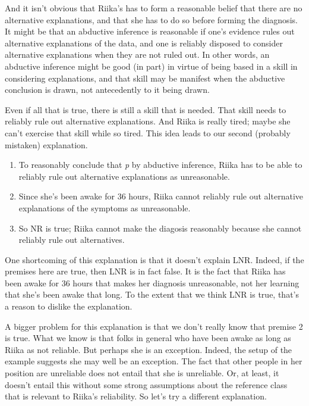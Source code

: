 And it isn't obvious that \gls{Riika}'s has to form a reasonable belief that there are no alternative explanations, and that she has to do so before forming the diagnosis. It might be that an abductive inference is reasonable if one's evidence rules out alternative explanations of the data, and one is reliably disposed to consider alternative explanations when they are not ruled out. In other words, an abductive inference might be good (in part) in virtue of being based in a skill in considering explanations, and that skill may be manifest when the abductive conclusion is drawn, not antecedently to it being drawn.

Even if all that is true, there is still a skill that is needed. That skill needs to reliably rule out alternative explanations. And \gls{Riika} is really tired; maybe she can't exercise that skill while so tired. This idea leads to our second (probably mistaken) explanation.

\begin{enumerate}
\item{} To reasonably conclude that \emph{p} by abductive inference, \gls{Riika} has to be able to reliably rule out alternative explanations as unreasonable.

\item{} Since she's been awake for 36 hours, \gls{Riika} cannot reliably rule out alternative explanations of the symptoms as unreasonable.

\item{} So NR is true; \gls{Riika} cannot make the diagosis reasonably because she cannot reliably rule out alternatives.

\end{enumerate}
One shortcoming of this explanation is that it doesn't explain LNR. Indeed, if the premises here are true, then LNR is in fact false. It is the fact that \gls{Riika} has been awake for 36 hours that makes her diagnosis unreasonable, not her learning that she's been awake that long. To the extent that we think LNR is true, that's a reason to dislike the explanation.

A bigger problem for this explanation is that we don't really know that premise 2 is true. What we know is that folks in general who have been awake as long as \gls{Riika} as not reliable. But perhaps she is an exception. Indeed, the setup of the example suggests she may well be an exception. The fact that other people in her position are unreliable does not entail that she is unreliable. Or, at least, it doesn't entail this without some strong assumptions about the reference class that is relevant to \gls{Riika}'s reliability. So let's try a different explanation.

